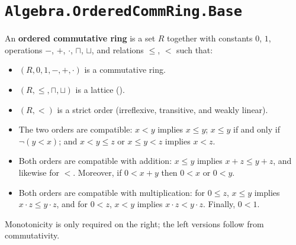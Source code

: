 \section{\texttt{Algebra.OrderedCommRing.Base}}

\begin{definition}
  \label{IsOrderedCommRing}
  An \textbf{ordered commutative ring} is a set $R$ together with constants $0$, $1$, operations $-$, $+$, $\cdot$, $\sqcap$, $\sqcup$, and relations $\le$, $<$ such that:
  \begin{itemize}
  \item $(R, 0, 1, -, +, \cdot)$ is a commutative ring.
  \item $(R, \le, \sqcap, \sqcup)$ is a lattice ().
  \item $(R, <)$ is a strict order (irreflexive, transitive, and weakly linear).
  \item The two orders are compatible: $x < y$ implies $x \le y$; $x \le y$ if and only if $\neg(y < x)$; and $x < y \le z$ or $x \le y < z$ implies $x < z$.
  \item Both orders are compatible with addition: $x \le y$ implies $x + z \le y + z$, and likewise for $<$. Moreover, if $0 < x + y$ then $0 < x$ or $0 < y$.
  \item Both orders are compatible with multiplication: for $0 \le z$, $x \le y$ implies $x \cdot z \le y \cdot z$, and for $0 < z$, $x < y$ implies $x \cdot z < y \cdot z$. Finally, $0 < 1$.
  \end{itemize}
  Monotonicity is only required on the right; the left versions follow from commutativity.
\end{definition}
